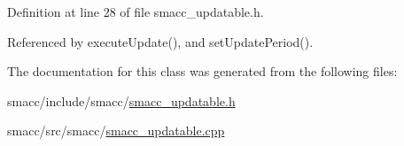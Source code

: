 Definition at line 28 of file smacc\+\_\+updatable.\+h.



Referenced by execute\+Update(), and set\+Update\+Period().



The documentation for this class was generated from the following files\+:\begin{DoxyCompactItemize}
\item 
smacc/include/smacc/\hyperlink{smacc__updatable_8h}{smacc\+\_\+updatable.\+h}\item 
smacc/src/smacc/\hyperlink{smacc__updatable_8cpp}{smacc\+\_\+updatable.\+cpp}\end{DoxyCompactItemize}
